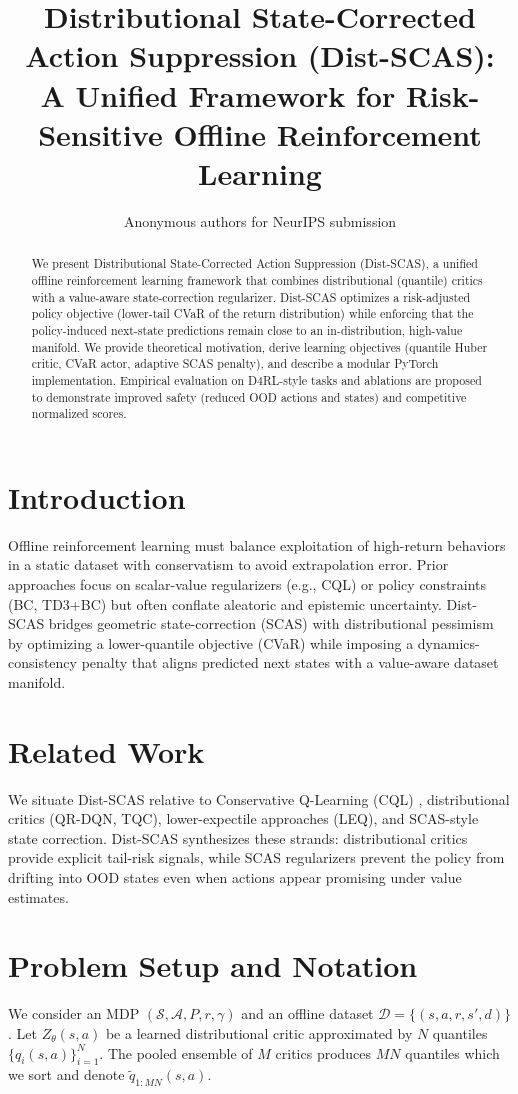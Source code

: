 \documentclass{article}
\title{Distributional State-Corrected Action Suppression (Dist-SCAS):\\A Unified Framework for Risk-Sensitive Offline Reinforcement Learning}
\author{Anonymous authors for NeurIPS submission}
\date{}
\begin{document}
\maketitle

\begin{abstract}
We present Distributional State-Corrected Action Suppression (Dist-SCAS), a unified offline reinforcement learning framework that combines distributional (quantile) critics with a value-aware state-correction regularizer. Dist-SCAS optimizes a risk-adjusted policy objective (lower-tail CVaR of the return distribution) while enforcing that the policy-induced next-state predictions remain close to an in-distribution, high-value manifold. We provide theoretical motivation, derive learning objectives (quantile Huber critic, CVaR actor, adaptive SCAS penalty), and describe a modular PyTorch implementation. Empirical evaluation on D4RL-style tasks and ablations are proposed to demonstrate improved safety (reduced OOD actions and states) and competitive normalized scores.
\end{abstract}

\section{Introduction}
Offline reinforcement learning must balance exploitation of high-return behaviors in a static dataset with conservatism to avoid extrapolation error. Prior approaches focus on scalar-value regularizers (e.g., CQL) or policy constraints (BC, TD3+BC) but often conflate aleatoric and epistemic uncertainty. Dist-SCAS bridges geometric state-correction (SCAS) with distributional pessimism by optimizing a lower-quantile objective (CVaR) while imposing a dynamics-consistency penalty that aligns predicted next states with a value-aware dataset manifold.

\section{Related Work}
We situate Dist-SCAS relative to Conservative Q-Learning (CQL) \citep{cql2020}, distributional critics (QR-DQN, TQC), lower-expectile approaches (LEQ), and SCAS-style state correction. Dist-SCAS synthesizes these strands: distributional critics provide explicit tail-risk signals, while SCAS regularizers prevent the policy from drifting into OOD states even when actions appear promising under value estimates.

\section{Problem Setup and Notation}
We consider an MDP $(\mathcal{S},\mathcal{A},P,r,\gamma)$ and an offline dataset $\mathcal{D}=\{(s,a,r,s',d)\}$. Let $Z_\theta(s,a)$ be a learned distributional critic approximated by $N$ quantiles $\{q_i(s,a)\}_{i=1}^N$. The pooled ensemble of $M$ critics produces $MN$ quantiles which we sort and denote $\tilde q_{1:MN}(s,a)$.
\end{document}
